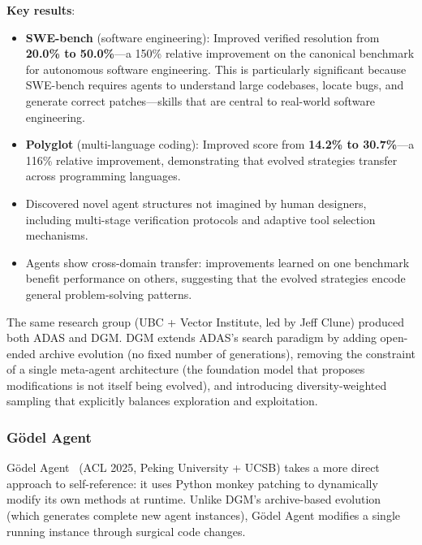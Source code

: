 \textbf{Key results}:
\begin{itemize}
\item \textbf{SWE-bench} (software engineering): Improved verified resolution from \textbf{20.0\% to 50.0\%}---a 150\% relative improvement on the canonical benchmark for autonomous software engineering. This is particularly significant because SWE-bench requires agents to understand large codebases, locate bugs, and generate correct patches---skills that are central to real-world software engineering.
\item \textbf{Polyglot} (multi-language coding): Improved score from \textbf{14.2\% to 30.7\%}---a 116\% relative improvement, demonstrating that evolved strategies transfer across programming languages.
\item Discovered novel agent structures not imagined by human designers, including multi-stage verification protocols and adaptive tool selection mechanisms.
\item Agents show cross-domain transfer: improvements learned on one benchmark benefit performance on others, suggesting that the evolved strategies encode general problem-solving patterns.
\end{itemize}

The same research group (UBC + Vector Institute, led by Jeff Clune) produced both ADAS and DGM. DGM extends ADAS's search paradigm by adding open-ended archive evolution (no fixed number of generations), removing the constraint of a single meta-agent architecture (the foundation model that proposes modifications is not itself being evolved), and introducing diversity-weighted sampling that explicitly balances exploration and exploitation.

\subsubsection{G\"odel Agent}

G\"odel Agent~\citep{yin2025godelagent} (ACL 2025, Peking University + UCSB) takes a more direct approach to self-reference: it uses Python monkey patching to dynamically modify its own methods at runtime. Unlike DGM's archive-based evolution (which generates complete new agent instances), G\"odel Agent modifies a single running instance through surgical code changes.

